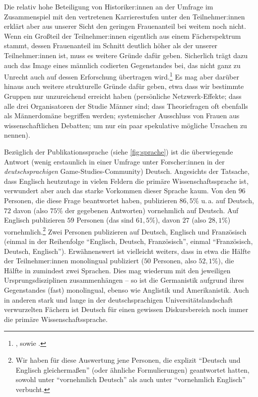 \documentclass{scrartcl}
\begin{document}
Die relativ hohe Beteiligung von Historiker:innen an der Umfrage im Zusammenspiel mit den vertretenen Karrierestufen unter den Teilnehmer:innen erklärt aber aus unserer Sicht den geringen Frauenanteil bei weitem noch nicht.
Wenn ein Großteil der Teilnehmer:innen eigentlich aus einem Fächerspektrum stammt, dessen Frauenanteil im Schnitt deutlich höher als der unserer Teilnehmer:innen ist, muss es weitere Gründe dafür geben.
Sicherlich trägt dazu auch das Image eines männlich codierten Gegenstandes bei, das nicht ganz zu Unrecht auch auf dessen Erforschung übertragen wird.\footnote{\autocite[Vgl.][S.~28]{unterhuber_wer_2024}, sowie \autocite[][S.~214]{vossen_cultural_2018}.}
Es mag aber darüber hinaus auch weitere strukturelle Gründe dafür geben, etwa dass wir bestimmte Gruppen nur unzureichend erreicht haben (persönliche Netzwerk-Effekte; dass alle drei Organisatoren der Studie Männer sind; dass Theoriefragen oft ebenfalls als Männerdomäne begriffen werden; systemischer Ausschluss von Frauen aus wissenschaftlichen Debatten; um nur ein paar spekulative mögliche Ursachen zu nennen).

Bezüglich der Publikationssprache (siehe \autoref{fig:sprache}) ist die überwiegende Antwort (wenig erstaunlich in einer Umfrage unter Forscher:innen in der \textit{deutschsprachigen} Game-Studies-Community) Deutsch.
Angesichts der Tatsache, dass Englisch heutzutage in vielen Feldern die primäre Wissenschaftssprache ist, verwundert aber auch das starke Vorkommen dieser Sprache kaum.
Von den $96$ Personen, die diese Frage beantwortet haben, publizieren $86,5\%$ u.\,a. auf Deutsch, $72$ davon (also $75\%$ der gegebenen Antworten) vornehmlich auf Deutsch.
Auf Englisch publizieren $59$ Personen (das sind $61,5\%$), davon $27$ (also $28,1\%$) vornehmlich.\footnote{Wir haben für diese Auswertung jene Personen, die explizit \enquote{Deutsch und Englisch gleichermaßen} (oder ähnliche Formulierungen) geantwortet hatten, sowohl unter \enquote{vornehmlich Deutsch} als auch unter \enquote{vornehmlich Englisch} verbucht.}
Zwei Personen publizieren auf Deutsch, Englisch und Französisch (einmal in der Reihenfolge \enquote{Englisch, Deutsch, Französisch}, einmal \enquote{Französisch, Deutsch, Englisch}).
Erwähnenswert ist vielleicht weiters, dass in etwa die Hälfte der Teilnehmer:innen monolingual publiziert ($50$ Personen, also $52,1\%$), die Hälfte in zumindest zwei Sprachen.
Dies mag wiederum mit den jeweiligen Ursprungsdisziplinen zusammenhängen -- so ist die Germanistik aufgrund ihres Gegenstandes (fast) monolingual, ebenso wie Anglistik und Amerikanistik.
Auch in anderen stark und lange in der deutschsprachigen Universitätslandschaft verwurzelten Fächern ist Deutsch für einen gewissen Diskursbereich noch immer die primäre Wissenschaftssprache.
\end{document}
